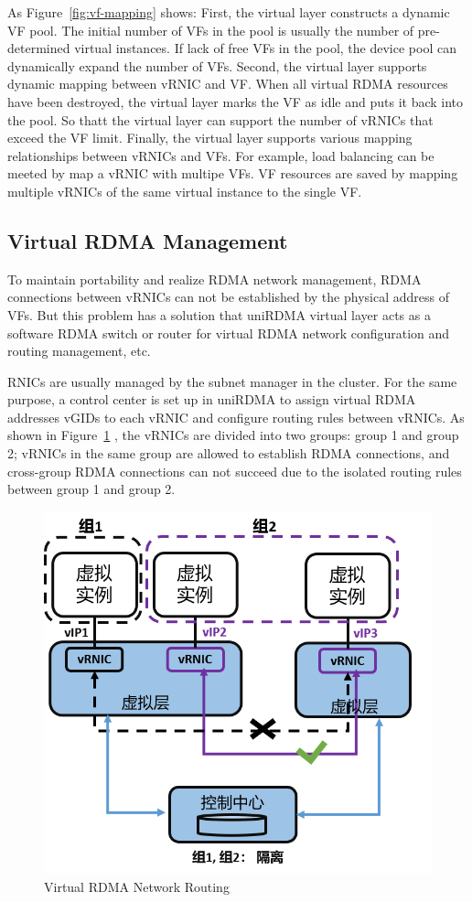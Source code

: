 As Figure~\ref{fig:vf-mapping} shows: First, the virtual layer constructs a dynamic VF pool. The initial number of VFs in the pool is usually the number of pre-determined virtual instances. If lack of free VFs in the pool, the device pool can dynamically expand the number of VFs. Second, the virtual layer supports dynamic mapping between vRNIC and VF. When all virtual RDMA resources have been destroyed, the virtual layer marks the VF as idle and puts it back into the pool. So thatt the virtual layer can support the number of vRNICs that exceed the VF limit. Finally, the virtual layer supports various mapping relationships between vRNICs and VFs. For example, load balancing can be meeted by map a vRNIC with multipe VFs. VF resources are saved by mapping multiple vRNICs of the same virtual instance to the single VF. 

\subsection{Virtual RDMA Management}
To maintain portability and realize RDMA network management, RDMA connections between vRNICs can not be established by the physical address of VFs. But this problem has a solution that uniRDMA virtual layer acts as a software RDMA switch or router for virtual RDMA network configuration and routing management, etc.

RNICs are usually managed by the subnet manager in the cluster. For the same purpose, a control center is set up in uniRDMA to assign virtual RDMA addresses vGIDs to each vRNIC and configure routing rules between vRNICs. As shown in Figure~\ref{fig:route-config} , the vRNICs are divided into two groups: group 1 and group 2; vRNICs in the same group are allowed to establish RDMA connections, and cross-group RDMA connections can not succeed due to the isolated routing rules between group 1 and group 2.

\begin{figure}[!ht]
	\centering
	\includegraphics[width=1.0\linewidth]{images/route-config}
	\caption{Virtual RDMA Network Routing}
	\label{fig:route-config}
\end{figure}

